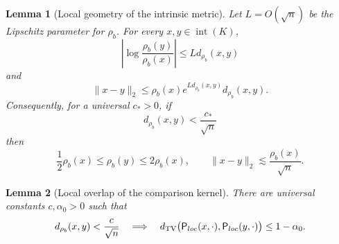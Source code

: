 \documentclass[10pt,a4paper]{amsart}
\newtheorem{lemma}{Lemma}
\newcommand{\dtv}{d_{\mathrm{TV}}}
\begin{document}
\begin{lemma}[Local geometry of the intrinsic metric]
\label{lem:log-affine-intrinsic-local-geometry}
Let $L=O(\sqrt{n})$ be the Lipschitz parameter for $\rho_b$.  For every $x,y\in\operatorname{int}(K)$,
\begin{equation}\label{eq:log-affine-intrinsic-log-distortion}
 \left|\log\frac{\rho_b(y)}{\rho_b(x)}\right|
 \le L d_{\rho_b}(x,y)
\end{equation}
and
\begin{equation}\label{eq:log-affine-intrinsic-euclidean-distortion}
 \|x-y\|_2
 \le
 \rho_b(x)e^{L d_{\rho_b}(x,y)}d_{\rho_b}(x,y).
\end{equation}
Consequently, for a universal $c_*>0$, if
\begin{equation}\label{eq:log-affine-intrinsic-nearby}
 d_{\rho_b}(x,y)<\frac{c_*}{\sqrt n}
\end{equation}
then
\begin{equation}\label{eq:log-affine-intrinsic-local-geometry}
 \frac12\rho_b(x)\le\rho_b(y)\le2\rho_b(x),
 \qquad
 \|x-y\|_2\lesssim \frac{\rho_b(x)}{\sqrt n}.
\end{equation}
\end{lemma}

\begin{lemma}[Local overlap of the comparison kernel]
\label{lem:log-affine-local-overlap}
There are universal constants $c,\alpha_0>0$ such that
\begin{equation}\label{eq:log-affine-local-overlap}
 d_{\rho_b}(x,y)<\frac{c}{\sqrt n}
 \quad\Longrightarrow\quad
 \dtv\bigl({\sf P}_{\rm loc}(x,\cdot),{\sf P}_{\rm loc}(y,\cdot)\bigr)
 \le1-\alpha_0.
\end{equation}
\end{lemma}
\end{document}
